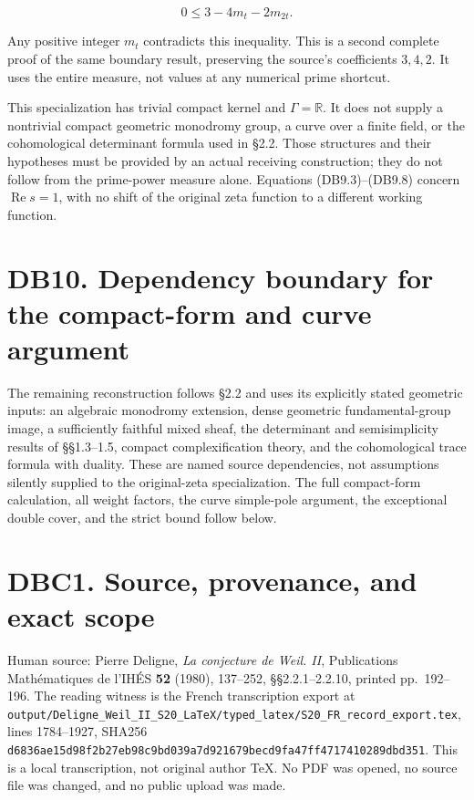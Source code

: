 \documentclass[
]{report}
\begin{document}
\[
 0\leq3-4m_t-2m_{2t}.
 \tag{DB9.8}
\]

Any positive integer \(m_t\) contradicts this inequality. This is a
second complete proof of the same boundary result, preserving the
source's coefficients \(3,4,2\). It uses the entire measure, not values
at any numerical prime shortcut.

This specialization has trivial compact kernel and \(\Gamma=\mathbb R\).
It does not supply a nontrivial compact geometric monodromy group, a
curve over a finite field, or the cohomological determinant formula used
in §2.2. Those structures and their hypotheses must be provided by an
actual receiving construction; they do not follow from the prime-power
measure alone. Equations (DB9.3)--(DB9.8) concern
\(\operatorname{Re}s=1\), with no shift of the original zeta function to
a different working function.

\section{DB10. Dependency boundary for the compact-form and curve
argument}\label{db10.-dependency-boundary-for-the-compact-form-and-curve-argument}

The remaining reconstruction follows §2.2 and uses its explicitly stated
geometric inputs: an algebraic monodromy extension, dense geometric
fundamental-group image, a sufficiently faithful mixed sheaf, the
determinant and semisimplicity results of §§1.3--1.5, compact
complexification theory, and the cohomological trace formula with
duality. These are named source dependencies, not assumptions silently
supplied to the original-zeta specialization. The full compact-form
calculation, all weight factors, the curve simple-pole argument, the
exceptional double cover, and the strict bound follow below.

\section{DBC1. Source, provenance, and exact
scope}\label{dbc1.-source-provenance-and-exact-scope}

Human source: Pierre Deligne, \emph{La conjecture de Weil. II},
Publications Mathématiques de l'IHÉS \textbf{52} (1980), 137--252,
§§2.2.1--2.2.10, printed pp.~192--196. The reading witness is the French
transcription export at
\nolinkurl{output/Deligne_Weil_II_S20_LaTeX/typed_latex/S20_FR_record_export.tex},
lines 1784--1927, SHA256
\nolinkurl{d6836ae15d98f2b27eb98c9bd039a7d921679becd9fa47ff4717410289dbd351}.
This is a local transcription, not original author TeX. No PDF was
opened, no source file was changed, and no public upload was made.
\end{document}
